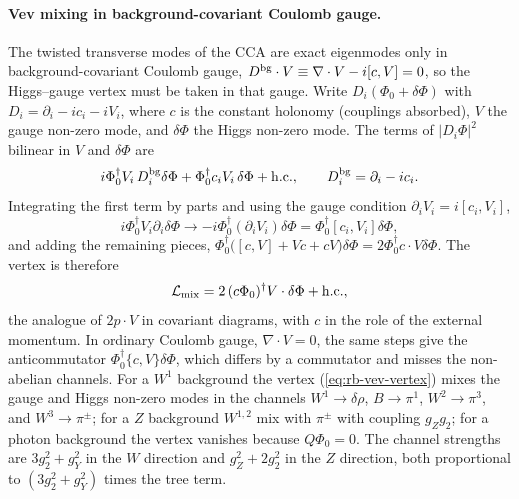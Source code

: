 \paragraph{Vev mixing in background-covariant Coulomb gauge.}
The twisted transverse modes of the CCA are exact eigenmodes only in background-covariant Coulomb gauge, $D^{\rm bg}\cdot V\equiv\nabla\cdot V-i[c,V]=0$, so the Higgs--gauge vertex must be taken in that gauge.
Write $D_i(\Phi_0+\delta\Phi)$ with $D_i=\partial_i-ic_i-iV_i$, where $c$ is the constant holonomy (couplings absorbed), $V$ the gauge non-zero mode, and $\delta\Phi$ the Higgs non-zero mode.
The terms of $|D_i\Phi|^2$ bilinear in $V$ and $\delta\Phi$ are
\begin{equation}
i\Phi_0^\dagger V_i\,D^{\rm bg}_i\delta\Phi+\Phi_0^\dagger c_iV_i\,\delta\Phi+{\rm h.c.},\qquad D^{\rm bg}_i=\partial_i-ic_i .
\label{eq:rb-vev-raw}
\end{equation}
Integrating the first term by parts and using the gauge condition $\partial_iV_i=i[c_i,V_i]$,
\begin{equation}
i\Phi_0^\dagger V_i\partial_i\delta\Phi\to-i\Phi_0^\dagger(\partial_iV_i)\delta\Phi=\Phi_0^\dagger[c_i,V_i]\delta\Phi,
\label{eq:rb-vev-parts}
\end{equation}
and adding the remaining pieces, $\Phi_0^\dagger\bigl([c,V]+Vc+cV\bigr)\delta\Phi=2\Phi_0^\dagger c\cdot V\delta\Phi$.
The vertex is therefore
\begin{equation}
\mathcal L_{\rm mix}=2\,(c\Phi_0)^\dagger V\cdot\delta\Phi+{\rm h.c.},
\label{eq:rb-vev-vertex}
\end{equation}
the analogue of $2p\cdot V$ in covariant diagrams, with $c$ in the role of the external momentum.
In ordinary Coulomb gauge, $\nabla\cdot V=0$, the same steps give the anticommutator $\Phi_0^\dagger\{c,V\}\delta\Phi$, which differs by a commutator and misses the non-abelian channels.
For a $W^1$ background the vertex (\ref{eq:rb-vev-vertex}) mixes the gauge and Higgs non-zero modes in the channels $W^1\to\delta\rho$, $B\to\pi^1$, $W^2\to\pi^3$, and $W^3\to\pi^\pm$; for a $Z$ background $W^{1,2}$ mix with $\pi^\pm$ with coupling $g_Zg_2$; for a photon background the vertex vanishes because $Q\Phi_0=0$.
The channel strengths are $3g_2^2+g_Y^2$ in the $W$ direction and $g_Z^2+2g_2^2$ in the $Z$ direction, both proportional to $(3g_2^2+g_Y^2)$ times the tree term.


